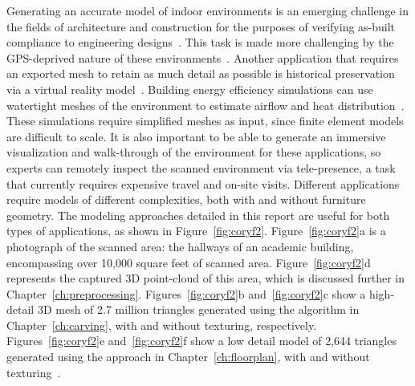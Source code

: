 \documentclass[12pt,onecolumn,oneside]{book}
\begin{document}
Generating an accurate model of indoor environments is an emerging challenge in the fields of architecture and construction for the purposes of verifying as-built compliance to engineering designs~\cite{Bosche10,Xiong13}.  This task is made more challenging by the GPS-deprived nature of these environments~\cite{Liang13}.  Another application that requires an exported mesh to retain as much detail as possible is historical preservation via a virtual reality model~\cite{VillageHeritage,Carving}.  Building energy efficiency simulations can use watertight meshes of the environment to estimate airflow and heat distribution~\cite{EnergyPlus}.  These simulations require simplified meshes as input, since finite element models are difficult to scale.  It is also important to be able to generate an immersive visualization and walk-through of the environment for these applications, so experts can remotely inspect the scanned environment via tele-presence, a task that currently requires expensive travel and on-site visits.  Different applications require models of different complexities, both with and without furniture geometry.  The modeling approaches detailed in this report are useful for both types of applications, as shown in Figure~\ref{fig:coryf2}.  Figure~\ref{fig:coryf2}a is a photograph of the scanned area: the hallways of an academic building, encompassing over 10,000 square feet of scanned area.  Figure~\ref{fig:coryf2}d represents the captured 3D point-cloud of this area, which is discussed further in Chapter~\ref{ch:preprocessing}.  Figures~\ref{fig:coryf2}b and~\ref{fig:coryf2}c show a high-detail 3D mesh of 2.7 million triangles generated using the algorithm in Chapter~\ref{ch:carving}, with and without texturing, respectively.  Figures~\ref{fig:coryf2}e and~\ref{fig:coryf2}f show a low detail model of 2,644 triangles generated using the approach in Chapter~\ref{ch:floorplan}, with and without texturing~\cite{Turner14Journal}.
\end{document}
